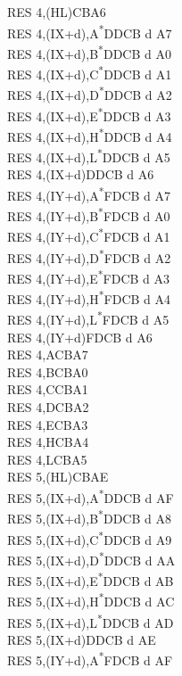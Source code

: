 \documentclass[twoside,openright,a4paper]{book}
\begin{document}
\begin{multicols}{3}
{\begin{tabbing}
	RES 4,(HL)\>CBA6\\
	RES 4,(IX+d),A\textsuperscript{*}\>DDCB d A7\\
	RES 4,(IX+d),B\textsuperscript{*}\>DDCB d A0\\
	RES 4,(IX+d),C\textsuperscript{*}\>DDCB d A1\\
	RES 4,(IX+d),D\textsuperscript{*}\>DDCB d A2\\
	RES 4,(IX+d),E\textsuperscript{*}\>DDCB d A3\\
	RES 4,(IX+d),H\textsuperscript{*}\>DDCB d A4\\
	RES 4,(IX+d),L\textsuperscript{*}\>DDCB d A5\\
	RES 4,(IX+d)\>DDCB d A6\\
	RES 4,(IY+d),A\textsuperscript{*}\>FDCB d A7\\
	RES 4,(IY+d),B\textsuperscript{*}\>FDCB d A0\\
	RES 4,(IY+d),C\textsuperscript{*}\>FDCB d A1\\
	RES 4,(IY+d),D\textsuperscript{*}\>FDCB d A2\\
	RES 4,(IY+d),E\textsuperscript{*}\>FDCB d A3\\
	RES 4,(IY+d),H\textsuperscript{*}\>FDCB d A4\\
	RES 4,(IY+d),L\textsuperscript{*}\>FDCB d A5\\
	RES 4,(IY+d)\>FDCB d A6\\
	RES 4,A\>CBA7\\
	RES 4,B\>CBA0\\
	RES 4,C\>CBA1\\
	RES 4,D\>CBA2\\
	RES 4,E\>CBA3\\
	RES 4,H\>CBA4\\
	RES 4,L\>CBA5\\
	RES 5,(HL)\>CBAE\\
	RES 5,(IX+d),A\textsuperscript{*}\>DDCB d AF\\
	RES 5,(IX+d),B\textsuperscript{*}\>DDCB d A8\\
	RES 5,(IX+d),C\textsuperscript{*}\>DDCB d A9\\
	RES 5,(IX+d),D\textsuperscript{*}\>DDCB d AA\\
	RES 5,(IX+d),E\textsuperscript{*}\>DDCB d AB\\
	RES 5,(IX+d),H\textsuperscript{*}\>DDCB d AC\\
	RES 5,(IX+d),L\textsuperscript{*}\>DDCB d AD\\
	RES 5,(IX+d)\>DDCB d AE\\
	RES 5,(IY+d),A\textsuperscript{*}\>FDCB d AF\\

\end{tabbing}}
\end{multicols}
\end{document}
